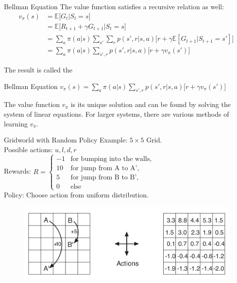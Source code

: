 \documentclass{beamer}
\begin{document}
\begin{frame}{Bellman Equation}
	The value function satisfies a recursive relation as well:
	\begin{align}
	v_{\pi}(s) &= \mathbb{E} \big[ G_t | S_t = s \big] \\
	&= \mathbb{E} \big[ R_{t+1} + \gamma G_{t+1} | S_t = s \big]\\
	&= \sum_a \pi (a|s) \sum_{s'} \sum_{r} p(s',r|s,a) \big[ r + \gamma \mathbb{E} [ G_{t+1} | S_{t+1} = s' ] \big] \\
	&= \sum_a \pi(a|s) \sum_{s',r} p(s',r|s,a) \big[ r + \gamma v_{\pi}(s')  \big] \label{bell}
	\end{align} 

	The result is called the

	\begin{exampleblock}{Bellman Equation}
	$v_{\pi}(s) = \sum_a \pi(a|s) \sum_{s',r} p(s',r|s,a) \big[ r + \gamma v_{\pi}(s')  \big] \label{bell} $
	\end{exampleblock}
	
	The value function $v_{\pi}$ is its unique solution and can be found by solving the system of linear equations. For larger systems, there are various methods of learning $v_{\pi}$. 
	\end{frame}

\begin{frame}{Gridworld with Random Policy}
	Example: $5 \times 5$ Grid. \\
	Possible actions: ${u,l,d,r}$ \\
	Rewards: $R=\begin{cases}-1 & \text{for bumping into the walls,} \\ 10 & \text{for jump from A to A',} \\ 5 & \text{for jump from B to B',} \\ 0 & \text{else}  \end{cases}$ \\
	Policy: Choose action from  uniform distribution.
	\begin{figure}
	\centering
	\includegraphics[width=0.9\linewidth]{Images/gridworldrandom.png}\\	
	\end{figure}
\end{frame}
\end{document}
